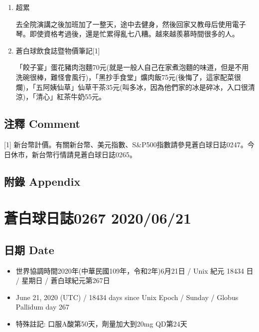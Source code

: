 \documentclass[a5paper, 11pt
]{book}
\providecommand{\tightlist}{%
  \setlength{\itemsep}{0pt}\setlength{\parskip}{0pt}}
\begin{document}
\begin{enumerate}
\def\labelenumi{\arabic{enumi}.}
\item
  超累

  去全院演講之後加班加了一整天，途中去健身，然後回家又教母后使用電子琴。即使資格考過後，還是忙累得亂七八糟。越來越羨慕時間很多的人。
\item
  蒼白球飲食誌暨物價筆記{[}1{]}

  「餃子宴」蛋花豬肉泡麵70元(就是一般人自己在家煮泡麵的味道，但是不用洗碗很棒，難怪會風行)，「黑抄手食堂」爌肉飯75元(後悔了，這家配菜很爛)，「五阿姨仙草」仙草干茶35元(叫多冰，因為他們家的冰是碎冰，入口很清涼)，「清心」紅茶牛奶55元。
\end{enumerate}

\hypertarget{ux6ce8ux91cb-comment-17}{%
\subsection{注釋 Comment}\label{ux6ce8ux91cb-comment-17}}

{[}1{]}
新台幣計價。有關新台幣、美元指數、S\&P500指數請參見蒼白球日誌0247。今日休市，新台幣行情請見蒼白球日誌0265。

\hypertarget{ux9644ux9304-appendix-17}{%
\subsection{附錄 Appendix}\label{ux9644ux9304-appendix-17}}

\hypertarget{ux84bcux767dux7403ux65e5ux8a8c0267-20200621}{%
\section{蒼白球日誌0267
2020/06/21}\label{ux84bcux767dux7403ux65e5ux8a8c0267-20200621}}

\hypertarget{ux65e5ux671f-date-18}{%
\subsection{日期 Date}\label{ux65e5ux671f-date-18}}

\begin{itemize}
\tightlist
\item
  世界協調時間2020年(中華民國109年，令和2年)6月21日 / Unix 紀元 18434 日
  / 星期日 / 蒼白球紀元第267日
\item
  June 21, 2020 (UTC) / 18434 days since Unix Epoch / Sunday / Globus
  Pallidum day 267
\item
  特殊註記: 口服A酸第50天，劑量加大到20mg QD第24天
\end{itemize}
\end{document}
